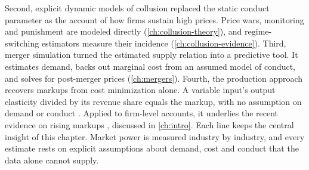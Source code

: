 Second, explicit dynamic models of collusion replaced the static conduct parameter as the account of how firms sustain
high prices. Price wars, monitoring and punishment are modeled directly (\cref{ch:collusion-theory}), and
regime-switching estimators measure their incidence (\cref{ch:collusion-evidence}). Third, merger simulation turned the
estimated supply relation into a predictive tool. It estimates demand, backs out marginal cost from an assumed model of
conduct, and solves for post-merger prices (\cref{ch:mergers}). Fourth, the production approach recovers markups from
cost minimization alone. A variable input's output elasticity divided by its revenue share equals the markup, with no
assumption on demand or conduct \citep{Hall1988,DeLoeckerWarzynski2012}. Applied to firm-level accounts, it underlies
the recent evidence on rising markups \citep{DeLoeckerEeckhoutUnger2020}, discussed in \cref{ch:intro}. Each line keeps
the central insight of this chapter. Market power is measured industry by industry, and every estimate rests on
explicit assumptions about demand, cost and conduct that the data alone cannot supply.
